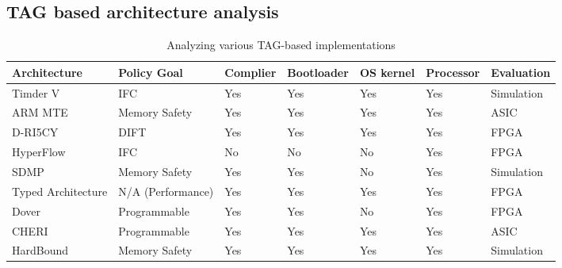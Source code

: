 



\subsection{TAG based architecture analysis}

\begin{landscape}
\begin{table}[]
  \centering
  \caption{Analyzing various TAG-based implementations}
  \begin{tabular}{@{}lllllll@{}}
  \toprule
  \textbf{Architecture} & \textbf{Policy Goal} & \textbf{Complier} & \textbf{Bootloader} & \textbf{OS kernel} & \textbf{Processor} & \textbf{Evaluation} \\ \midrule
  Timder V              & IFC                  & Yes               & Yes                 & Yes                & Yes                & Simulation          \\
  ARM MTE               & Memory Safety        & Yes               & Yes                 & Yes                & Yes                & ASIC                \\
  D-RI5CY               & DIFT                 & Yes               & Yes                 & Yes                & Yes                & FPGA                \\
  HyperFlow             & IFC                  & No                & No                  & No                 & Yes                & FPGA                \\
  SDMP                  & Memory Safety        & Yes               & Yes                 & No                 & Yes                & Simulation          \\
  Typed Architecture    & N/A (Performance)    & Yes               & Yes                 & Yes                & Yes                & FPGA                \\
  Dover                 & Programmable         & Yes               & Yes                 & No                 & Yes                & FPGA                \\
  CHERI                 & Programmable         & Yes               & Yes                 & Yes                & Yes                & ASIC                \\
  HardBound             & Memory Safety        & Yes               & Yes                 & Yes                & Yes                & Simulation          \\ \bottomrule
  \end{tabular}
  \end{table}
\end{landscape}

